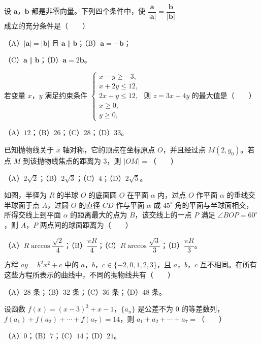 \begin{question}
设 $\boldsymbol a$，$\boldsymbol b$ 都是非零向量。下列四个条件中，使 $\dfrac{\boldsymbol a}{|\boldsymbol a|}=\dfrac{\boldsymbol b}{|\boldsymbol b|}$ 成立的充分条件是\mbox{（　　）}

（A）$|\boldsymbol a|=|\boldsymbol b|$ 且 $\boldsymbol a\parallel\boldsymbol b$；（B）$\boldsymbol a=-\boldsymbol b$；

（C）$\boldsymbol a\parallel\boldsymbol b$；（D）$\boldsymbol a=2\boldsymbol b$。

\end{question}
\begin{question}
若变量 $x$，$y$ 满足约束条件 $\begin{cases}x-y\geqslant-3,\\x+2y\leqslant12,\\2x+y\leqslant12,\\x\geqslant0,\\y\geqslant0,\end{cases}$ 则 $z=3x+4y$ 的最大值是\mbox{（　　）}

（A）$12$；（B）$26$；（C）$28$；（D）$33$。

\end{question}
\begin{question}
已知抛物线关于 $x$ 轴对称，它的顶点在坐标原点 $O$，并且经过点 $M(2,y_0)$。若点 $M$ 到该抛物线焦点的距离为 $3$，则 $|OM|=$\mbox{（　　）}

（A）$2\sqrt2$；（B）$2\sqrt3$；（C）$4$；（D）$2\sqrt5$。

\Needspace{0.4\textheight}
\end{question}
\begin{question}
如图，半径为 $R$ 的半球 $O$ 的底面圆 $O$ 在平面 $\alpha$ 内，过点 $O$ 作平面 $\alpha$ 的垂线交半球面于点 $A$，过圆 $O$ 的直径 $CD$ 作与平面 $\alpha$ 成 $45^\circ$ 角的平面与半球面相交，所得交线上到平面 $\alpha$ 的距离最大的点为 $B$，该交线上的一点 $P$ 满足 $\angle BOP=60^\circ$，则 $A$，$P$ 两点间的球面距离为\mbox{（　　）}
\nopagebreak[4]
\begin{center}\end{center}
\nopagebreak[4]
（A）$R\arccos\dfrac{\sqrt2}{4}$；（B）$\dfrac{\pi R}{4}$；（C）$R\arccos\dfrac{\sqrt3}{3}$；（D）$\dfrac{\pi R}{3}$。

\end{question}
\begin{question}
方程 $ay=b^2x^2+c$ 中的 $a$，$b$，$c\in\{-2,0,1,2,3\}$，且 $a$，$b$，$c$ 互不相同。在所有这些方程所表示的曲线中，不同的抛物线共有\mbox{（　　）}

（A）$28$ 条；（B）$32$ 条；（C）$36$ 条；（D）$48$ 条。

\end{question}
\begin{question}
设函数 $f(x)=(x-3)^3+x-1$，$\{a_n\}$ 是公差不为 $0$ 的等差数列，$f(a_1)+f(a_2)+\cdots+f(a_7)=14$，则 $a_1+a_2+\cdots+a_7=$\mbox{（　　）}

（A）$0$；（B）$7$；（C）$14$；（D）$21$。

\end{question}

